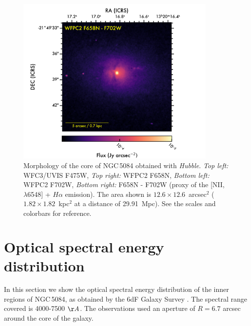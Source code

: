 \documentclass[modern]{CORE-AAS/aastex631}
\begin{document}
\begin{figure}[]
\begin{center}
\includegraphics[trim={140 0 60 57}, clip, height=8.4cm]{FIGURES/NGC5084_F658N_F702W.png}

\caption{Morphology of the core of NGC\,5084 obtained with \emph{Hubble}. \emph{Top left:} WFC3/UVIS F475W, \emph{Top right:} WFPC2 F658N, \emph{Bottom left:} WFPC2 F702W, \emph{Bottom right:} F658N - F702W (proxy of the [NII, $\lambda$6548] + $H\alpha$ emission). The area shown is $12.6\times12.6$~arcsec$^2$ ($1.82\times1.82$~kpc$^2$ at a distance of 29.91~Mpc). See the scales and colorbars for reference.} 
\label{fig:NGC5084_multiband}
\end{center}
\end{figure}

\section{Optical spectral energy distribution} 
\label{Appendix:OpticalSpectra}

In this section we show the optical spectral energy distribution of the inner regions of NGC\,5084, as obtained by the 6dF Galaxy Survey \citep{jones+2004mnras355_747}. The spectral range covered is 4000-7500 $\AA$. The observations used an aperture of $R=6.7$ arcsec around the core of the galaxy. 




\end{document}
